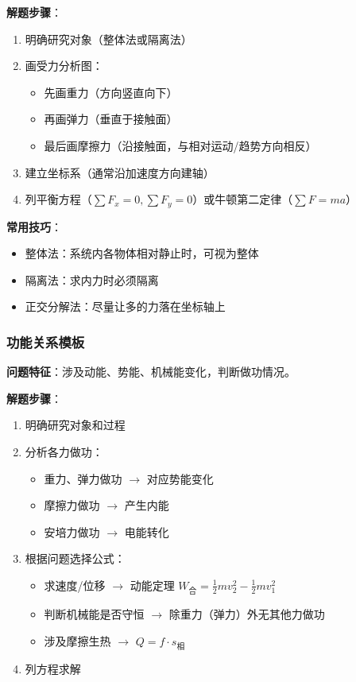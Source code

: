 \textbf{解题步骤}：
\begin{enumerate}
  \item 明确研究对象（整体法或隔离法）
  \item 画受力分析图：
    \begin{itemize}
      \item 先画重力（方向竖直向下）
      \item 再画弹力（垂直于接触面）
      \item 最后画摩擦力（沿接触面，与相对运动/趋势方向相反）
    \end{itemize}
  \item 建立坐标系（通常沿加速度方向建轴）
  \item 列平衡方程（$\sum F_x=0,\sum F_y=0$）或牛顿第二定律（$\sum F = ma$）
\end{enumerate}

\textbf{常用技巧}：
\begin{itemize}
  \item 整体法：系统内各物体相对静止时，可视为整体
  \item 隔离法：求内力时必须隔离
  \item 正交分解法：尽量让多的力落在坐标轴上
\end{itemize}

\subsubsection{功能关系模板}

\textbf{问题特征}：涉及动能、势能、机械能变化，判断做功情况。

\textbf{解题步骤}：
\begin{enumerate}
  \item 明确研究对象和过程
  \item 分析各力做功：
    \begin{itemize}
      \item 重力、弹力做功 $\to$ 对应势能变化
      \item 摩擦力做功 $\to$ 产生内能
      \item 安培力做功 $\to$ 电能转化
    \end{itemize}
  \item 根据问题选择公式：
    \begin{itemize}
      \item 求速度/位移 $\to$ 动能定理 $W_{\text{合}} = \frac12 mv_2^2 - \frac12 mv_1^2$
      \item 判断机械能是否守恒 $\to$ 除重力（弹力）外无其他力做功
      \item 涉及摩擦生热 $\to$ $Q = f\cdot s_{\text{相}}$
    \end{itemize}
  \item 列方程求解
\end{enumerate}

